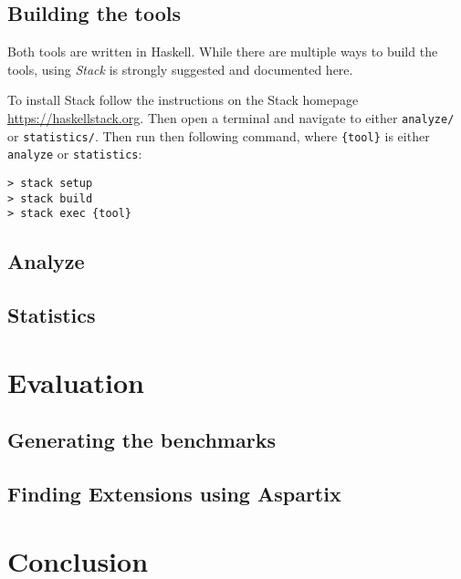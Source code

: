 \documentclass{scrartcl}
\begin{document}
\subsection{Building the tools}

Both tools are written in Haskell. While there are multiple ways to build the
tools, using \emph{Stack} is strongly suggested and documented here.

To install Stack follow the instructions on the Stack homepage
\url{https://haskellstack.org}. Then open a terminal and navigate to either
\texttt{analyze/} or \texttt{statistics/}. Then run then following command,
where \texttt{\{tool\}} is either \texttt{analyze} or \texttt{statistics}:

\begin{verbatim}
> stack setup
> stack build
> stack exec {tool}
\end{verbatim}

\subsection{Analyze}
\subsection{Statistics}

\section{Evaluation}
\label{evaluation}
\subsection{Generating the benchmarks}
\subsection{Finding Extensions using Aspartix}

\section{Conclusion}
\label{conclusion}

\printbibliography
\end{document}
